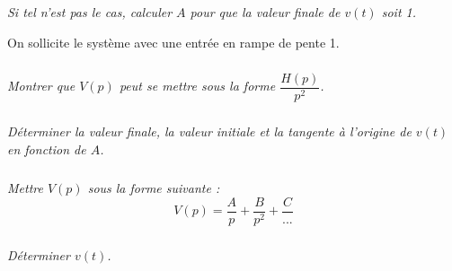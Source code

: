 \documentclass[10pt]{article}
\newif\ifprof
\begin{document}
\subparagraph{}
\textit{Si tel n’est pas le cas, calculer $A$ pour que la valeur finale de $v(t)$ soit 1.}
\ifprof
\begin{corrige}
\end{corrige}
\else
\fi

On sollicite le système avec une entrée en rampe de pente 1. 

\subparagraph{}
\textit{Montrer que $V(p)$ peut se mettre sous la forme $\dfrac{H(p)}{p^2}$. }
\ifprof
\begin{corrige}
\end{corrige}
\else
\fi



\subparagraph{}
\textit{Déterminer la valeur finale, la valeur initiale et la tangente à l’origine de $v(t)$ en fonction de $A$.}
\ifprof
\begin{corrige}
\end{corrige}
\else
\fi


\subparagraph{}
\textit{Mettre $V(p)$ sous la forme suivante : }
$$
V(p)=\dfrac{A}{p}+\dfrac{B}{p^2} +\dfrac{C}{...}
$$

\ifprof
\begin{corrige}
\end{corrige}
\else
\fi



\subparagraph{}
\textit{Déterminer $v(t)$.}
\ifprof
\begin{corrige}
\end{corrige}
\else
\fi
\end{document}
